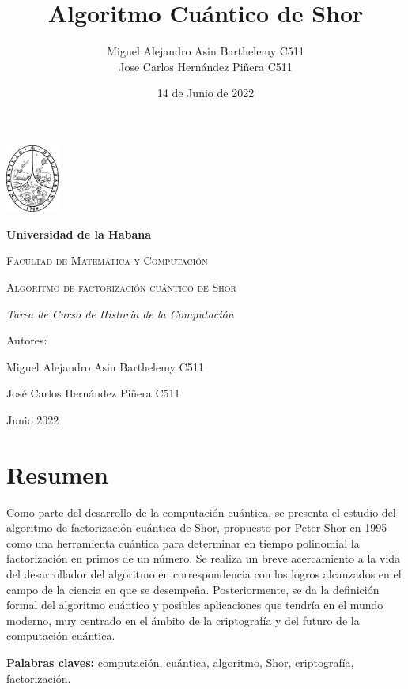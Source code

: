 \documentclass[a4paper,11pt]{article}
\title {Algoritmo Cu\'antico de Shor}
\date{14 de Junio de 2022}
\author{Miguel Alejandro Asin Barthelemy C511\\Jose Carlos Hern\'andez Pi\~nera C511}
\begin{document}
\begin{titlepage}
    \centering
    {\includegraphics[width=0.13\textwidth]{logo.png}\par}
    \vspace{1cm}
    {\bfseries\LARGE Universidad de la Habana \par}
    \vspace{1cm}
    {\scshape\Large Facultad de Matem\'atica y Computaci\'on \par}
    \vspace{3cm}
    {\scshape\Huge Algoritmo de factorizaci\'on cu\'antico de Shor \par}
    \vspace{3cm}
    {\itshape\Large Tarea de Curso de Historia de la Computaci\'on \par}
    \vfill
    {\Large Autores: \par}
    {\Large Miguel Alejandro Asin Barthelemy C511 \par}
    {\Large Jos\'e Carlos Hern\'andez Pi\~nera C511 \par}
    \vfill
    {\Large Junio 2022 \par}
\end{titlepage}

\section*{Resumen}
\par Como parte del desarrollo de la computaci\'on cu\'antica, se presenta el estudio del algoritmo de factorizaci\'on cu\'antica de Shor, propuesto por Peter Shor en 1995 como una herramienta cu\'antica para determinar en tiempo polinomial la factorizaci\'on en primos de un n\'umero. Se realiza un breve acercamiento a la vida del desarrollador del algoritmo en correspondencia con los logros alcanzados en el campo de la ciencia en que se desempe\~na. Posteriormente, se da la definici\'on formal del algoritmo cu\'antico y posibles aplicaciones que tendr\'ia en el mundo moderno, muy centrado en el \'ambito de la criptograf\'ia y del futuro de la computaci\'on cu\'antica.\\

\par \textbf{Palabras claves:} computaci\'on, cu\'antica, algoritmo, Shor, criptograf\'ia, factorizaci\'on.
\end{document}
